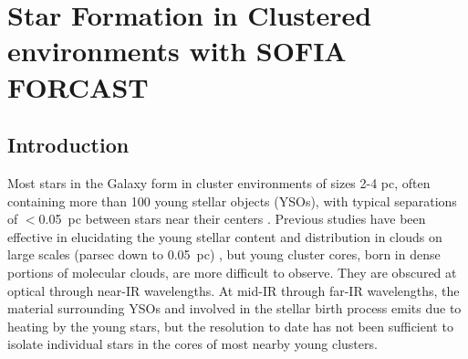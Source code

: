 \chapter{Star Formation in Clustered environments with SOFIA FORCAST}

\label{chap:SOFIA}

\section{Introduction}
Most stars in the Galaxy form in cluster environments of sizes 2-4 pc, often containing more than 100 young stellar objects (YSOs), with typical separations of $<$0.05~pc between stars near their centers \citep{Porras:2003kxa, Allen:2007wqa, Gutermuth:2009gca}.
Previous studies have been effective in elucidating the young stellar content and distribution in clouds on large scales (parsec down to 0.05~pc) \citep{Evans-ARAA2012}, but young cluster cores, born in dense portions of molecular clouds, are more difficult to observe. They are obscured at optical through near-IR wavelengths. At mid-IR through far-IR wavelengths, the material surrounding YSOs and involved in the stellar birth process emits due to heating by the young stars, but the resolution to date has not been sufficient to isolate individual stars in the cores of most nearby young clusters.




